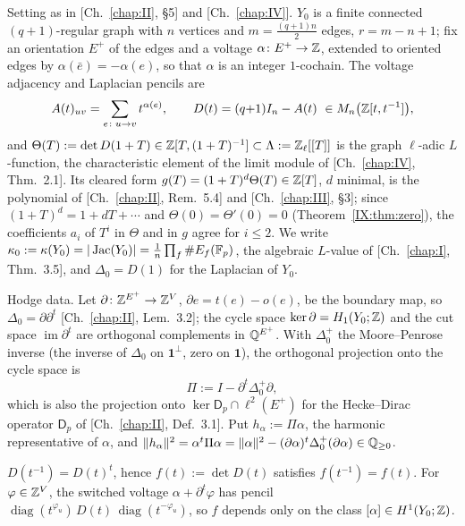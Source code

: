 Setting as in [Ch.~\ref{chap:II}, \S5] and [Ch.~\ref{chap:IV}]. $Y_0$ is a finite connected $(q{+}1)$-regular graph
with $n$ vertices and $m=\frac{(q+1)n}2$ edges, $r=m-n+1$; fix an orientation $E^+$ of
the edges and a voltage $\alpha\colon E^+\to\mathbb{Z}$, extended to oriented edges by
$\alpha(\bar e)=-\alpha(e)$, so that $\alpha$ is an integer $1$-cochain. The voltage
adjacency and Laplacian pencils are
\[
A(t)_{uv}=\sum_{e\colon u\to v}t^{\alpha(e)},\qquad
D(t)=(q{+}1)I_n-A(t)\ \in M_n\bigl(\mathbb{Z}[t,t^{-1}]\bigr),
\]
and $\Theta(T):=\det D(1+T)\in\mathbb{Z}[T,(1+T)^{-1}]\subset\Lambda:=\mathbb{Z}_\ell[[T]]$ is the graph
$\ell$-adic $L$-function, the characteristic element of the limit module of
[Ch.~\ref{chap:IV}, Thm.~2.1]. Its cleared form $g(T)=(1+T)^{d}\Theta(T)\in\mathbb{Z}[T]$, $d$ minimal, is the
polynomial of [Ch.~\ref{chap:II}, Rem.~5.4] and [Ch.~\ref{chap:III}, \S3]; since $(1+T)^{d}=1+dT+\cdots$ and
$\Theta(0)=\Theta'(0)=0$ (Theorem~\ref{IX:thm:zero}), the coefficients
$a_i$ of $T^{i}$ in $\Theta$ and in $g$ agree for $i\le2$. We write
$\kappa_0:=\kappa(Y_0)=|\operatorname{Jac}(Y_0)|=\frac1n\prod_f\#E_f(\mathbb{F}_p)$, the algebraic $L$-value
of [Ch.~\ref{chap:I}, Thm.~3.5], and $\Delta_0=D(1)$ for the Laplacian of $Y_0$.

Hodge data. Let $\partial\colon\mathbb{Z}^{E^+}\to\mathbb{Z}^{V}$, $\partial e=t(e)-o(e)$, be the
boundary map, so $\Delta_0=\partial\partial^{t}$ [Ch.~\ref{chap:II}, Lem.~3.2]; the cycle space
$\ker\partial=H_1(Y_0;\mathbb{Z})$ and the cut space $\operatorname{im}\partial^{t}$ are
orthogonal complements in $\mathbb{Q}^{E^+}$. With $\Delta_0^{+}$ the Moore--Penrose inverse
(the inverse of $\Delta_0$ on $\mathbf1^{\perp}$, zero on $\mathbf1$), the orthogonal
projection onto the cycle space is
\[
\Pi:=I-\partial^{t}\Delta_0^{+}\partial ,
\]
which is also the projection onto $\ker\mathsf D_p\cap\ell^{2}(E^+)$ for the
Hecke--Dirac operator $\mathsf D_p$ of [Ch.~\ref{chap:II}, Def.~3.1]. Put $h_\alpha:=\Pi\alpha$, the
harmonic representative of $\alpha$, and $\|h_\alpha\|^{2}=\alpha^{t}\Pi\alpha
=\|\alpha\|^{2}-(\partial\alpha)^{t}\Delta_0^{+}(\partial\alpha)\in\mathbb{Q}_{\ge0}$.

\begin{lemma}\label{IX:lem:sym}
$D(t^{-1})=D(t)^{t}$, hence $f(t):=\det D(t)$ satisfies $f(t^{-1})=f(t)$. For
$\varphi\in\mathbb{Z}^{V}$, the switched voltage $\alpha+\partial^{t}\varphi$ has pencil
$\operatorname{diag}(t^{\varphi_u})\,D(t)\,\operatorname{diag}(t^{-\varphi_u})$, so $f$
depends only on the class $[\alpha]\in H^{1}(Y_0;\mathbb{Z})$.
\end{lemma}

